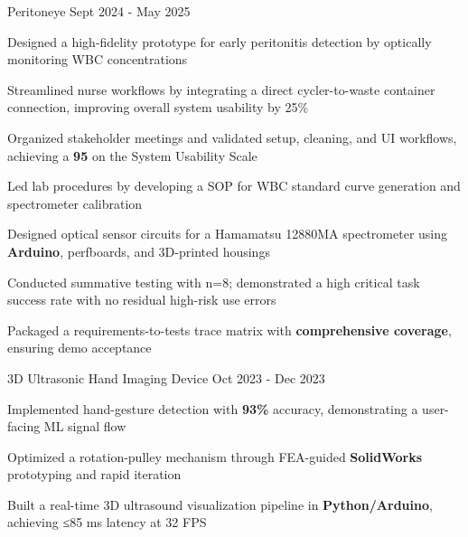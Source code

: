 \documentclass[11pt, a4paper]{russell}
\begin{document}
\begin{cventries}
\cvproject
  {Peritoneye} %
  {Sept 2024 - May 2025} %
  {
    \begin{cvitems}
        \item {Designed a high-fidelity prototype for early peritonitis detection by optically monitoring WBC concentrations}
        \item {Streamlined nurse workflows by integrating a direct cycler-to-waste container connection, improving overall system usability by 25\%}
        \item {Organized stakeholder meetings and validated setup, cleaning, and UI workflows, achieving a \textbf{95} on the System Usability Scale} 
        \item {Led lab procedures by developing a SOP for WBC standard curve generation and spectrometer calibration}
        \item {Designed optical sensor circuits for a Hamamatsu 12880MA spectrometer using \textbf{Arduino}, perfboards, and 3D-printed housings}
        \item {Conducted summative testing with n=8; demonstrated a high critical task success rate with no residual high-risk use errors}
        \item {Packaged a requirements-to-tests trace matrix with \textbf{comprehensive coverage}, ensuring demo acceptance}
    \end{cvitems}
  }

\cvproject
  {3D Ultrasonic Hand Imaging Device} %
  {Oct 2023 - Dec 2023} %
  {
    \begin{cvitems}
        \item {Implemented hand-gesture detection with \textbf{93\%} accuracy, demonstrating a user-facing ML signal flow}
        \item {Optimized a rotation-pulley mechanism through FEA-guided \textbf{SolidWorks} prototyping and rapid iteration}
        \item {Built a real-time 3D ultrasound visualization pipeline in \textbf{Python/Arduino}, achieving ≤85 ms latency at 32 FPS}
    \end{cvitems}
  }
\end{cventries}

\begin{cvskills}
\end{cvskills}

\vspace*{\fill}
\end{document}
